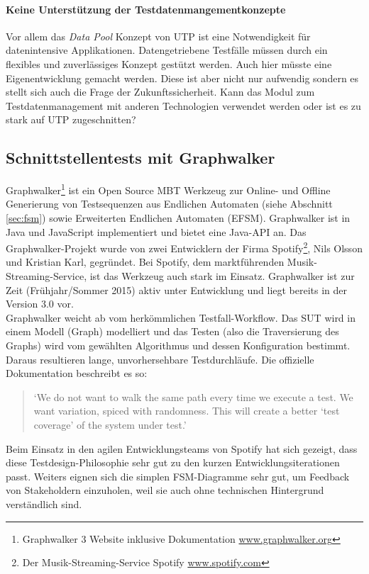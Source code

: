 \paragraph{Keine Unterstützung der Testdatenmangementkonzepte}
Vor allem das \textit{Data Pool} Konzept von \Gls{UTP} ist eine Notwendigkeit für datenintensive Applikationen. Datengetriebene Testfälle müssen durch ein flexibles und zuverlässiges Konzept gestützt werden. Auch hier müsste eine Eigenentwicklung gemacht werden. Diese ist aber nicht nur aufwendig sondern es stellt sich auch die Frage der Zukunftssicherheit. Kann das Modul zum Testdatenmanagement mit anderen Technologien verwendet werden oder ist es zu stark auf \Gls{UTP} zugeschnitten?

\subsection{Schnittstellentests mit Graphwalker}
\label{sec:graphwalker}
Graphwalker\footnote{Graphwalker 3 Website inklusive Dokumentation \url{www.graphwalker.org}} ist ein Open Source \Gls{MBT} Werkzeug zur Online- und Offline Generierung von Testsequenzen aus Endlichen Automaten (siehe Abschnitt \ref{sec:fsm}) sowie Erweiterten Endlichen Automaten (EFSM). Graphwalker ist in Java und JavaScript implementiert und bietet eine Java-API an. Das Graphwalker-Projekt wurde von zwei Entwicklern der Firma Spotify\footnote{Der Musik-Streaming-Service Spotify \url{www.spotify.com}}, Nils Olsson und Kristian Karl, gegründet. Bei Spotify, dem marktführenden Musik-Streaming-Service, ist das Werkzeug auch stark im Einsatz. Graphwalker ist zur Zeit (Frühjahr/Sommer 2015) aktiv unter Entwicklung und liegt bereits in der Version 3.0 vor.\\
Graphwalker weicht ab vom herkömmlichen Testfall-Workflow. Das \Gls{SUT} wird in einem Modell (Graph) modelliert und das Testen (also die Traversierung des Graphs) wird vom gewählten Algorithmus und dessen Konfiguration bestimmt. Daraus resultieren lange, unvorhersehbare Testdurchläufe. Die offizielle Dokumentation beschreibt es so:

\begin{quote}
`We do not want to walk the same path every time we execute a test. We want variation, spiced with randomness. This will create a better `test coverage' of the system under test.' \cite{_graphwalker_2015}
\end{quote}

Beim Einsatz in den agilen Entwicklungsteams von Spotify hat sich gezeigt, dass diese Testdesign-Philosophie sehr gut zu den kurzen Entwicklungsiterationen passt. Weiters eignen sich die simplen \Gls{FSM}-Diagramme sehr gut, um Feedback von Stakeholdern einzuholen, weil sie auch ohne technischen Hintergrund verständlich sind.

